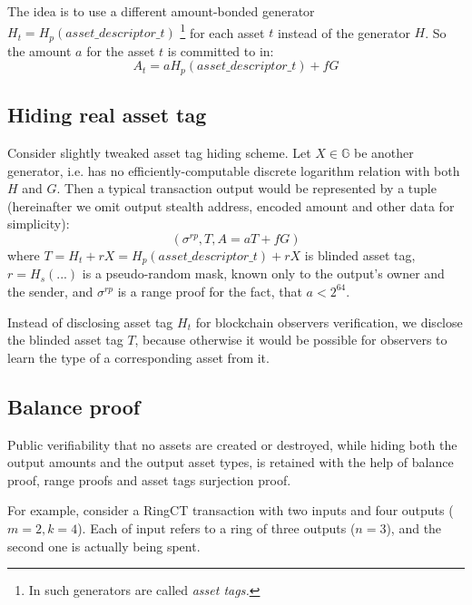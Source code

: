 \documentclass{article}
\begin{document}
The idea is to use a different amount-bonded generator $H_t=H_p(\textit{asset\_descriptor\_t})$ \footnote{In \cite{conf_assets} such generators are called \textit{asset tags.}} for each asset $t$ instead of the generator $H$. So the amount $a$ for the asset $t$ is committed to in:
\[  A_t = a H_p(\textit{asset\_descriptor\_t}) + fG\]

\subsection{Hiding real asset tag}
Consider slightly tweaked asset tag hiding scheme. Let $X \in \mathbb{G}$ be another generator, i.e. has no efficiently-computable discrete logarithm relation with both $H$ and $G$. Then a typical transaction output would be represented by a tuple (hereinafter we omit output stealth address, encoded amount and other data for simplicity):
\[
    ( \sigma^{rp}, T, A = aT + fG )
\] where $T = H_t + rX = H_p(\textit{asset\_descriptor\_t}) + rX $ is blinded asset tag, $r = H_s(...)$ is a pseudo-random mask, known only to the output's owner and the sender, and $\sigma^{rp}$ is a range proof for the fact, that $a < 2^{64}$.

Instead of disclosing asset tag $H_t$ for blockchain observers verification, we disclose the blinded asset tag $T$, because otherwise it would be possible for observers to learn the type of a corresponding asset from it.

\subsection{Balance proof}
Public verifiability that no assets are created or destroyed, while hiding both the output amounts and the output asset types, is retained with the help of balance proof, range proofs and asset tags surjection proof.

For example, consider a RingCT transaction with two inputs and four outputs ($m=2, k=4$). Each of input refers to a ring of three outputs ($n=3$), and the second one is actually being spent.

\vspace{10pt}
\end{document}
